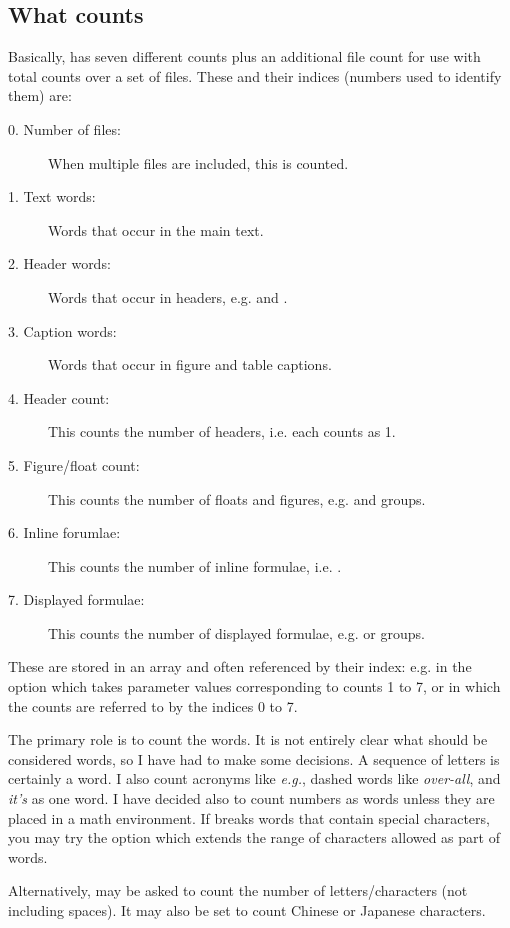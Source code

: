 \documentclass{article}
\begin{document}
\subsection{What \TeXcount{} counts}

Basically, \TeXcount{} has seven different counts plus an additional file count for use with total counts over a set of files. These and their indices (numbers used to identify them) are:
\begin{description}
\item[0. Number of files:] When multiple files are included, this is counted.
\item[1. Text words:] Words that occur in the main text.
\item[2. Header words:] Words that occur in headers, e.g.  and .
\item[3. Caption words:] Words that occur in figure and table captions.
\item[4. Header count:] This counts the number of headers, i.e. each  counts as 1.
\item[5. Figure/float count:] This counts the number of floats and figures, e.g.  and  groups.
\item[6. Inline forumlae:] This counts the number of inline formulae, i.e. \code{\$\ldots\$}.
\item[7. Displayed formulae:] This counts the number of displayed formulae, e.g. \code{\bs{[}\ldots\bs{]}} or  groups.
\end{description}
These are stored in an array and often referenced by their index: e.g. in the option  which takes parameter values corresponding to counts 1 to 7, or  in which the counts are referred to by the indices 0 to 7.

The primary role is to count the words. It is not entirely clear what should be considered words, so I have had to make some decisions. A sequence of letters is certainly a word. I also count acronyms like \textit{e.g.}, dashed words like \textit{over-all}, and \textit{it's} as one word. I have decided also to count numbers as words unless they are placed in a math environment. If \TeXcount{} breaks words that contain special characters, you may try the option  which extends the range of characters allowed as part of words.

Alternatively, \TeXcount{} may be asked to count the number of letters/characters (not including spaces). It may also be set to count Chinese or Japanese characters.
\end{document}
